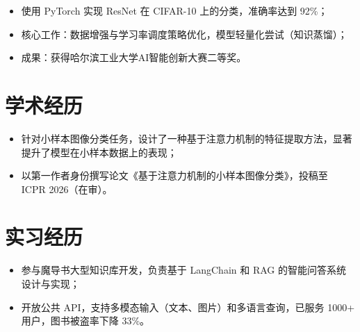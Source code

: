 \documentclass[watermark=true]{hitresume}
\begin{document}
\begin{itemize}
    \item 使用 PyTorch \textcolor{HITBlueAux2}{实现 ResNet 在 CIFAR-10 上的分类}，准确率达到 92\%；
    \item 核心工作：数据增强与学习率调度策略优化，模型轻量化尝试（知识蒸馏）；
    \item 成果：获得哈尔滨工业大学AI智能创新大赛二等奖。
\end{itemize}

\section{学术经历}
\begin{itemize}
    \item 针对小样本图像分类任务，设计了一种基于注意力机制的特征提取方法，显著提升了模型在小样本数据上的表现；
    \item 以第一作者身份撰写论文《基于注意力机制的小样本图像分类》，投稿至 \textcolor{HITBlueAux2}{ICPR 2026}（在审）。
\end{itemize}

\section{实习经历}
\begin{itemize}
    \item 参与魔导书大型知识库开发，负责基于 \textcolor{HITBlueAux2}{LangChain} 和
        \textcolor{HITBlueAux2}{RAG} 的智能问答系统设计与实现；
    \item 开放公共 API，支持多模态输入（文本、图片）和多语言查询，已服务 1000+ 用户，图书被盗率下降 33\%。
\end{itemize}
\end{document}
